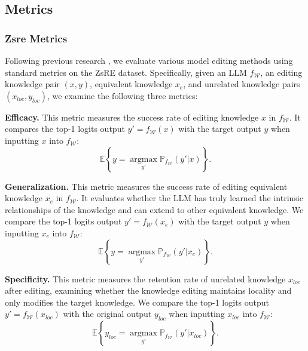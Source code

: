 \begin{itemize}
\end{itemize}

\subsection{Metrics}
\label{app:metric}
\subsubsection{Zsre Metrics}
Following previous research \cite{rome, mend}, we evaluate various model editing methods using standard metrics on the ZsRE dataset. Specifically, given an LLM $f_{\mathcal{W}}$, an editing knowledge pair $(x, y)$, equivalent  knowledge $x_e$, and unrelated knowledge pairs $(x_{loc}, y_{loc})$, we examine the following three metrics:

\textbf{Efficacy.} This metric measures the success rate of editing knowledge  $x$ in $f_{\mathcal{W}}$. It compares the top-1 logits output  $y'=f_{\mathcal{W}}(x)$ with the target output $y$ when inputting $x$ into $f_\mathcal{W}$:
\begin{equation}
\mathbb{E}\left\{y=\mathop{\arg\max}\limits_{y'}\mathbb{P}_{f_\mathcal{W}}(y'\left|x\right.)\right\}.
\end{equation}

\textbf{Generalization.} This metric measures the success rate of editing equivalent knowledge $x_e$ in $f_{\mathcal{W}}$. It evaluates whether the LLM has truly learned the intrinsic relationships of the knowledge and can extend to other equivalent knowledge. We compare the top-1 logits output $y'=f_{\mathcal{W}}(x_e)$ with the target output $y$ when inputting $x_e$ into $f_\mathcal{W}$:
\begin{equation}
\mathbb{E}\left\{y=\mathop{\arg\max}\limits_{y'}\mathbb{P}_{f_\mathcal{W}}(y'\left|x_e\right.)\right\}.
\end{equation}

\textbf{Specificity.} This metric measures the retention rate of unrelated knowledge $x_{loc}$ after editing, examining whether the knowledge editing maintains locality and only modifies the target knowledge. We compare the top-1 logits output $y'=f_{\mathcal{W}}(x_{loc})$ with the original output $y_{loc}$ when inputting $x_{loc}$ into $f_\mathcal{W}$:
\begin{equation}
\mathbb{E}\left\{y_{loc}=\mathop{\arg\max}\limits_{y'}\mathbb{P}_{f_\mathcal{W}}(y'\left|x_{loc}\right.)\right\}.
\end{equation}

